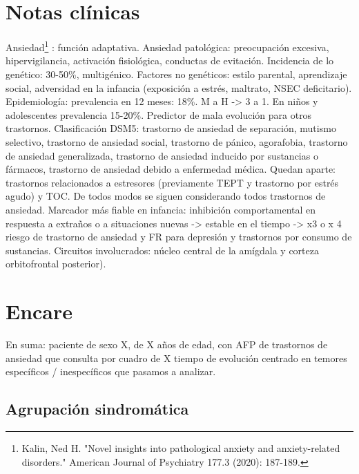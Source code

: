 \documentclass{scrbook}
\begin{document}
\section*{Notas clínicas}
Ansiedad\footnote{Kalin, Ned H. "Novel insights into pathological anxiety and anxiety-related disorders." American Journal of Psychiatry 177.3 (2020): 187-189.} : función adaptativa.
Ansiedad patológica: preocupación excesiva, hipervigilancia, activación fisiológica, conductas de evitación.
Incidencia de lo genético: 30-50\%, multigénico.
Factores no genéticos: estilo parental, aprendizaje social, adversidad en la infancia (exposición a estrés, maltrato, NSEC deficitario).
Epidemiología: prevalencia en 12 meses: 18\%. M a H -> 3 a 1. En niños y adolescentes prevalencia 15-20\%. 
Predictor de mala evolución para otros trastornos.
Clasificación DSM5: trastorno de ansiedad de separación, mutismo selectivo, trastorno de ansiedad social, trastorno de pánico, agorafobia, trastorno de ansiedad generalizada, trastorno de ansiedad inducido por sustancias o fármacos, trastorno de ansiedad debido a enfermedad médica.
Quedan aparte: trastornos relacionados a estresores (previamente TEPT y trastorno por estrés agudo) y TOC.
De todos modos se siguen considerando todos trastornos de ansiedad.
Marcador más fiable en infancia: inhibición comportamental en respuesta a extraños o a situaciones nuevas -> estable en el tiempo -> x3 o x 4 riesgo de trastorno de ansiedad y FR para depresión y trastornos por consumo de sustancias.
Circuitos involucrados: núcleo central de la amígdala y corteza orbitofrontal posterior).
\section*{Encare}
En suma: paciente de sexo X, de X años de edad, con AFP de trastornos de ansiedad que consulta por cuadro de X tiempo de evolución centrado en temores específicos / inespecíficos que pasamos a analizar.
\subsection*{Agrupación sindromática}
\end{document}
